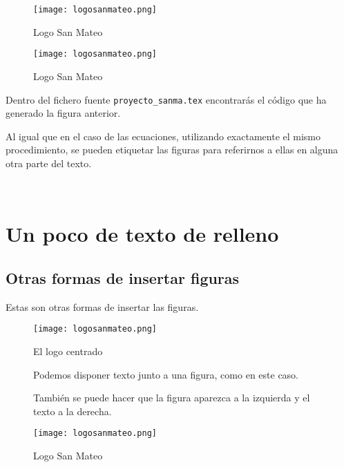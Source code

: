 \documentclass[a4paper,12pt]{article}
\begin{document}
{\begin{figure}[h]
\begin{minipage}[c]{.45\linewidth}
	\begin{center}
	\texttt{[image: logosanmateo.png]}
	\caption{Logo San Mateo}
    \end{center}
\end{minipage}
\hfill
\begin{minipage}[c]{.45\linewidth}
	\begin{center}
	\texttt{[image: logosanmateo.png]}
	\caption{Logo San Mateo}
	\end{center}
\end{minipage}
\end{figure}

Dentro del fichero fuente \verb|proyecto_sanma.tex| encontrarás el código que ha generado la figura anterior. 

Al igual que en el caso de las ecuaciones, utilizando exactamente el mismo procedimiento, se pueden etiquetar las figuras para referirnos a ellas en alguna otra parte del texto.

\ 

\section{Un poco de texto de relleno}


\lipsum[1-5]



\subsection{Otras formas de insertar figuras}

Estas son otras formas de insertar las figuras.

\begin{figure}[h]
\centering
\texttt{[image: logosanmateo.png]}
\caption{El logo centrado}
\end{figure}


\begin{figure}%
	\begin{minipage}[c]{.45\linewidth}
		Podemos disponer texto junto a una figura, como en este caso.
		
		También se puede hacer que la figura aparezca a la izquierda y el texto a la derecha.
	\end{minipage}
	\hfill
	\begin{minipage}[c]{.45\linewidth}
		\begin{center}
			\texttt{[image: logosanmateo.png]}
			\caption{Logo San Mateo}
		\end{center}
	\end{minipage}
\end{figure}

}
\end{document}
